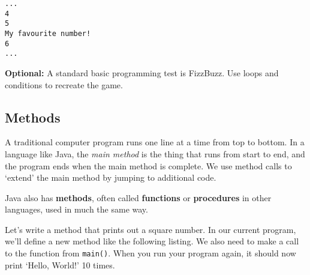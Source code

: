 		\begin{lstlisting}[style=Terminal, numbers=none]
...
4
5
My favourite number!
6
...
		\end{lstlisting}
		
		\textbf{Optional:} A standard basic programming test is FizzBuzz. Use loops and conditions to recreate the game.
		
		\iffalse		
		If you want to try to make something on your own with these statements, a common programming exercise with loops and conditions is FizzBuzz. You'll need the modulus operator \texttt{\%} for your conditions.
		
		\begin{aside}[FizzBuzz]
			FizzBuzz is a number game that is often used as a basic example of a programming task. The objective is to count up from 1 to a certain number, but for each number that is divisible by 3 say `Fizz', for each number divisible by 5 say `Buzz', and for numbers that are divisible by both numbers, say `FizzBuzz'.
			
			The answer for FizzBuzz starts 1, 2, Fizz, 4, Buzz, Fizz, 7, 8, Fizz, Buzz, 11, Fizz, 13, 14, FizzBuzz, 16...
		\end{aside}
		\fi
	
	\subsection{Methods}
	
		\begin{aside}
			A traditional computer program runs one line at a time from top to bottom. In a language like Java, the \textit{main method} is the thing that runs from start to end, and the program ends when the main method is complete. We use method calls to `extend' the main method by jumping to additional code.
		\end{aside}
	
		Java also has \textbf{methods}, often called \textbf{functions} or \textbf{procedures} in other languages, used in much the same way.
		
		Let's write a method that prints out a square number. In our current program, we'll define a new method like the following listing. We also need to make a call to the function from \texttt{main()}.  When you run your program again, it should now print `Hello, World!' 10 times.
		
		
		
